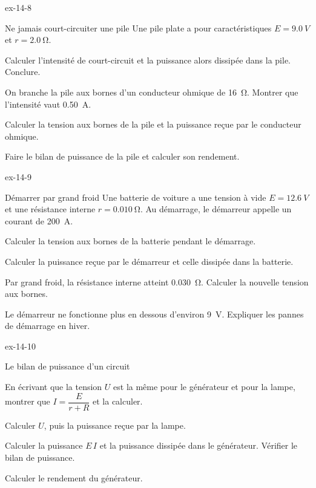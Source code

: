 \begin{blocLivre}{ex-14-8}
\begin{exercice}[2]{Ne jamais court-circuiter une pile}
Une pile plate a pour caractéristiques $E=\qty{9,0}{V}$ et $r=\qty{2,0}{\ohm}$.
\begin{questions}
\item Calculer l'intensité de court-circuit et la puissance alors dissipée dans la pile. Conclure.
\item On branche la pile aux bornes d'un conducteur ohmique de \qty{16}{\ohm}. Montrer que l'intensité vaut \qty{0,50}{A}.
\item Calculer la tension aux bornes de la pile et la puissance reçue par le conducteur ohmique.
\item Faire le bilan de puissance de la pile et calculer son rendement.
\end{questions}
\end{exercice}
\end{blocLivre}
\begin{blocLivre}{ex-14-9}
\begin{exercice}[2]{Démarrer par grand froid}
Une batterie de voiture a une tension à vide $E=\qty{12,6}{V}$ et une résistance interne $r=\qty{0,010}{\ohm}$. Au démarrage, le démarreur appelle
un courant de \qty{200}{A}.
\begin{questions}
\item Calculer la tension aux bornes de la batterie pendant le démarrage.
\item Calculer la puissance reçue par le démarreur et celle dissipée dans la batterie.
\item Par grand froid, la résistance interne atteint \qty{0,030}{\ohm}. Calculer la nouvelle tension aux bornes.
\item Le démarreur ne fonctionne plus en dessous d'environ \qty{9}{V}. Expliquer les pannes de démarrage en hiver.
\end{questions}
\end{exercice}
\end{blocLivre}
\begin{blocLivre}{ex-14-10}
\begin{exercice}[2]{Le bilan de puissance d'un circuit}
\begin{questions}
\item En écrivant que la tension $U$ est la même pour le générateur et pour la lampe, montrer que $I=\dfrac{E}{r+R}$ et la calculer.
\item Calculer $U$, puis la puissance reçue par la lampe.
\item Calculer la puissance $E\,I$ et la puissance dissipée dans le générateur. Vérifier le bilan de puissance.
\item Calculer le rendement du générateur.
\end{questions}
\end{exercice}
\end{blocLivre}

